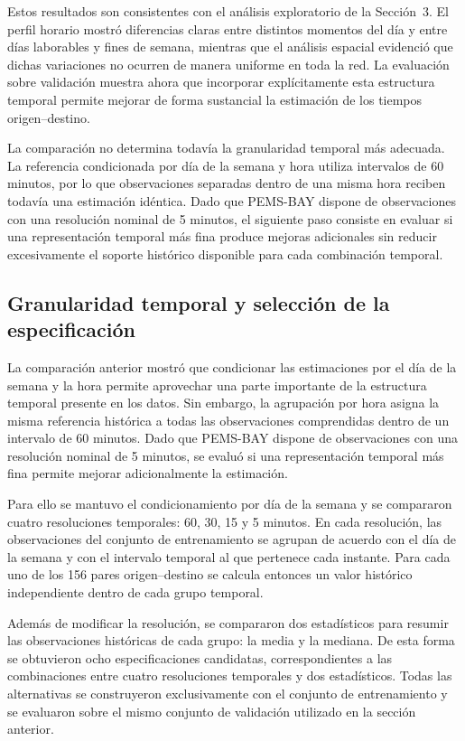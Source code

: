 \documentclass[11pt]{article}
\begin{document}
Estos resultados son consistentes con el análisis exploratorio de la Sección~3. El perfil horario mostró diferencias claras entre distintos momentos del día y entre días laborables y fines de semana, mientras que el análisis espacial evidenció que dichas variaciones no ocurren de manera uniforme en toda la red. La evaluación sobre validación muestra ahora que incorporar explícitamente esta estructura temporal permite mejorar de forma sustancial la estimación de los tiempos origen--destino.

La comparación no determina todavía la granularidad temporal más adecuada. La referencia condicionada por día de la semana y hora utiliza intervalos de 60 minutos, por lo que observaciones separadas dentro de una misma hora reciben todavía una estimación idéntica. Dado que PEMS-BAY dispone de observaciones con una resolución nominal de 5 minutos, el siguiente paso consiste en evaluar si una representación temporal más fina produce mejoras adicionales sin reducir excesivamente el soporte histórico disponible para cada combinación temporal.

\subsection{Granularidad temporal y selección de la especificación}

La comparación anterior mostró que condicionar las estimaciones por el día de la semana y la hora permite aprovechar una parte importante de la estructura temporal presente en los datos. Sin embargo, la agrupación por hora asigna la misma referencia histórica a todas las observaciones comprendidas dentro de un intervalo de 60 minutos. Dado que PEMS-BAY dispone de observaciones con una resolución nominal de 5 minutos, se evaluó si una representación temporal más fina permite mejorar adicionalmente la estimación.

Para ello se mantuvo el condicionamiento por día de la semana y se compararon cuatro resoluciones temporales: 60, 30, 15 y 5 minutos. En cada resolución, las observaciones del conjunto de entrenamiento se agrupan de acuerdo con el día de la semana y con el intervalo temporal al que pertenece cada instante. Para cada uno de los 156 pares origen--destino se calcula entonces un valor histórico independiente dentro de cada grupo temporal.

Además de modificar la resolución, se compararon dos estadísticos para resumir las observaciones históricas de cada grupo: la media y la mediana. De esta forma se obtuvieron ocho especificaciones candidatas, correspondientes a las combinaciones entre cuatro resoluciones temporales y dos estadísticos. Todas las alternativas se construyeron exclusivamente con el conjunto de entrenamiento y se evaluaron sobre el mismo conjunto de validación utilizado en la sección anterior.
\end{document}
